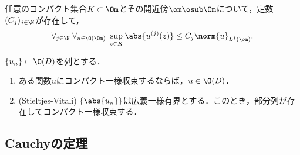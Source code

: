 \documentclass[uplatex, dvipdfmx]{jsreport}
\begin{document}
\begin{theorem}[Cauchyの評価]
    任意のコンパクト集合$K\subset\Om$とその開近傍$\om\osub\Om$について，定数$(C_j)_{j\in\N}$が存在して，
    \[\forall_{j\in\N}\;\forall_{u\in\O(\Om)}\;\sup_{z\in K}\abs{u^{(j)}(z)}\le C_j\norm{u}_{L^1(\om)}.\]
\end{theorem}

\begin{corollary}
    $\{u_n\}\subset\O(D)$を列とする．
    \begin{enumerate}
        \item ある関数$u$にコンパクト一様収束するならば，$u\in\O(D)$．
        \item (Stieltjes-Vitali) $\{\abs{u_n}\}$は広義一様有界とする．このとき，部分列が存在してコンパクト一様収束する．
    \end{enumerate}
\end{corollary}

\subsection{Cauchyの定理}
\end{document}
